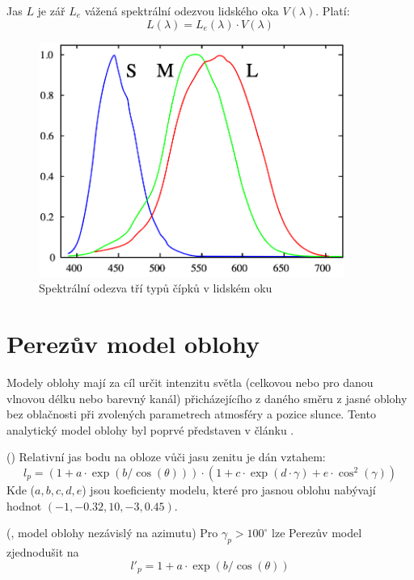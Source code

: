 \begin{definice}
  Jas $L$ je zář $L_e$ vážená spektrální odezvou lidského oka $V(\lambda)$. Platí:
  \begin{equation}
    L(\lambda) = L_e(\lambda) \cdot V(\lambda)
  \end{equation}
\end{definice}

\begin{figure}[htb]\centering
  \includegraphics[width=100mm]{../img/cipky}
  \caption{Spektrální odezva tří typů čípků v lidském oku \citep{cipky}}
\end{figure}

\section{Perezův model oblohy}
Modely oblohy mají za cíl určit intenzitu světla (celkovou nebo pro danou vlnovou délku nebo barevný kanál) přicházejícího z daného směru z jasné oblohy bez oblačnosti při zvolených parametrech atmosféry a pozice slunce.
Tento analytický model oblohy byl poprvé představen v článku \cite{Perez93}.
\begin{veta}\label{veta01:1}(\citealp{Perez93})
Relativní jas bodu na obloze vůči jasu zenitu je dán vztahem:
\begin{equation}\label{eq01:5}
  l_p = (1 + a \cdot \exp(b/\cos(\theta))) \cdot (1 + c \cdot \exp(d \cdot \gamma) + e \cdot \cos^2(\gamma))
\end{equation}
    Kde ($a, b, c, d, e$) jsou koeficienty modelu, které pro jasnou oblohu nabývají hodnot $(-1, -0.32, 10, -3, 0.45)$.
\end{veta}

\begin{veta}\label{veta01:2}(\citealp{Lalonde10}, model oblohy nezávislý na azimutu)
  Pro $\gamma_p>100^\circ$ lze Perezův model zjednodušit na
  \begin{equation}\label{eq01:5}
  l'_p = 1 + a \cdot \exp(b/\cos(\theta))
  \end{equation}
  \end{veta}

